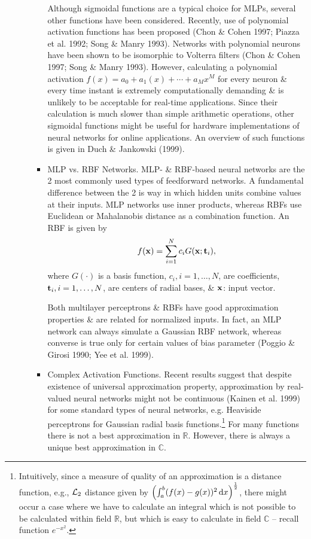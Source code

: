 \documentclass{article}
\begin{document}
\begin{enumerate}
\begin{itemize}
\begin{itemize}
			Although sigmoidal functions are a typical choice for MLPs, several other functions have been considered. Recently, use of polynomial activation functions has been proposed (Chon \& Cohen 1997; Piazza et al. 1992; Song \& Manry 1993). Networks with polynomial neurons have been shown to be isomorphic to Volterra filters (Chon \& Cohen 1997; Song \& Manry 1993). However, calculating a polynomial activation $f(x) = a_0 + a_1(x) + \cdots + a_Mx^M$ for every neuron \& every time instant is extremely computationally demanding \& is unlikely to be acceptable for real-time applications. Since their calculation is much slower than simple arithmetic operations, other sigmoidal functions might be useful for hardware implementations of neural networks for online applications. An overview of such functions is given in Duch \& Jankowski (1999).
			\item {\sf MLP vs. RBF Networks.} MLP- \& RBF-based neural networks are the 2 most commonly used types of feedforward networks. A fundamental difference between the 2 is way in which hidden units combine values at their inputs. MLP networks use inner products, whereas RBFs use Euclidean or Mahalanobis distance as a combination function. An RBF is given by
			\begin{equation}
				\label{RBF}
				f({\bf x}) = \sum_{i=1}^N c_iG({\bf x};{\bf t}_i),
			\end{equation}
			where $G(\cdot)$ is a basis function, $c_i,i = 1,\ldots,N$, are coefficients, ${\bf t}_i,i = 1,\ldots,N$, are centers of radial bases, \& ${\bf x}$: input vector.
			
			Both multilayer perceptrons \& RBFs have good approximation properties \& are related for normalized inputs. In fact, an MLP network can always simulate a Gaussian RBF network, whereas converse is true only for certain values of bias parameter (Poggio \& Girosi 1990; Yee et al. 1999).
			\item {\sf Complex Activation Functions.} Recent results suggest that despite existence of universal approximation property, approximation by real-valued neural networks might not be continuous (Kainen et al. 1999) for some standard types of neural networks, e.g. Heaviside perceptrons for Gaussian radial basis functions.\footnote{Intuitively, since a measure of quality of an approximation is a distance function, e.g., ${\cal L}_2$ distance given by $\left(\int_a^b (f(x) - g(x))^2\,{\rm d}x\right)^{\frac{1}{2}}$, there might occur a case where we have to calculate an integral which is not possible to be calculated within field $\mathbb{R}$, but which is easy to calculate in field $\mathbb{C}$ -- recall function $e^{-x^2}$.} For many functions there is not a best approximation in $\mathbb{R}$. However, there is always a unique best approximation in $\mathbb{C}$.
			

\end{itemize}
\end{itemize}
\end{enumerate}
\end{document}
